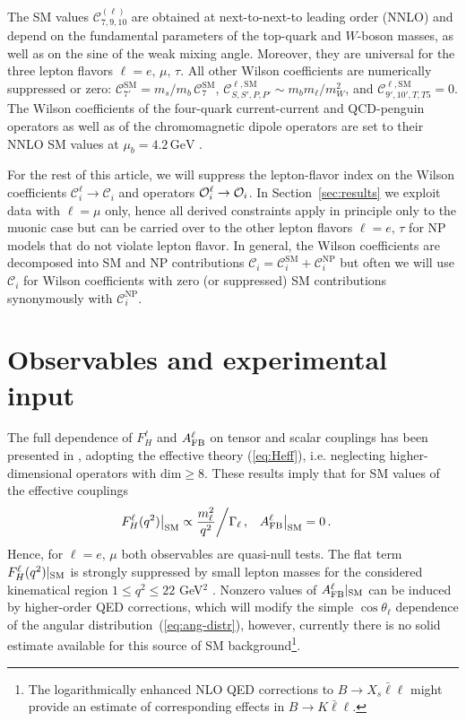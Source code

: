 \documentclass[twocolumn,epjc3]{svjour3}
\numberwithin{equation}{section}
\def \refeq#1{(\ref{#1})}
\def \refsec#1{Section~\ref{#1}}
\newcommand{\todo}[1]{{\color{magenta}{ {\bf ToDo: }{#1}}}}
\newcommand{\checked}[1]{{\color{brown}{ {\bf Checked: }{#1}}}}
\renewcommand{\checked}[1]{#1}
\newcommand{\wilson}[2][{}]{\mathcal{C}_{#2}^{\mathrm{#1}}}
\renewcommand{\[}{\big[}
\renewcommand{\]}{\big]}
\renewcommand{\(}{\big(}
\renewcommand{\)}{\big)}
\def \Op{{\cal O}}
\begin{document}
The SM values $\wilson[(\ell)]{7,9,10}$ are obtained at
next-to-next-to leading order (NNLO) \cite{Bobeth:2003at,
  Huber:2005ig} and depend on the fundamental parameters of the
top-quark and $W$-boson masses, as well as on the sine of the weak
mixing angle.  Moreover, they are universal for the three lepton
flavors $\ell = e,\, \mu,\, \tau$.  All other Wilson coefficients are
numerically suppressed or zero: $\wilson[SM]{7'} = m_s/m_b\,
\wilson[SM]{7}$, $\wilson[\ell, SM]{S,S',P,P'} \sim {m_b
  m_\ell/m_W^2}$, and $\wilson[\ell, SM]{9',10',T,T5} = 0$.  The
Wilson coefficients of the four-quark current-current and QCD-penguin
operators as well as of the chromomagnetic dipole operators are set to
their NNLO SM values at $\mu_b = 4.2 \, \mbox{GeV}$
\cite{Bobeth:2003at, Huber:2005ig}.

For the rest of this article, we will suppress the lepton-flavor index
on the Wilson coefficients $\wilson[\ell]{i} \to \wilson[]{i}$ and
operators $\Op_i^\ell \to \Op_i$. In \refsec{sec:results} we exploit
data with $\ell =\mu$ only, hence all derived constraints apply in
principle only to the muonic case but can be carried over to the other
lepton flavors $\ell = e,\, \tau$ for NP models that do not violate
lepton flavor. In general, the Wilson coefficients are decomposed into
SM and NP contributions $\wilson[]{i} = \wilson[SM]{i} +
\wilson[NP]{i}$ but often we will use $\wilson[]{i}$ for Wilson
coefficients with zero (or suppressed) SM contributions synonymously
with $\wilson[NP]{i}$.

%
%
%
\section{
  \checked{Observables and experimental input}
  \label{sec:observables}
}

The full dependence of $F_H^\ell$ and $A_{\rm FB}^\ell$ on tensor and
scalar couplings has been presented in \cite{Bobeth:2007dw,
  Bobeth:2012vn}, adopting the effective theory \refeq{eq:Heff},
i.e. neglecting higher-dimensional operators with {$\mbox{dim} \geq
  8$}. These results imply that for SM values of the effective
couplings
\begin{align}
  F_H^\ell(q^2) \big|_{\rm SM} & \propto \frac{m_\ell^2}{q^2}
    {\bigg/ \Gamma_\ell} \,, &
  A_{\rm FB}^\ell \big|_{\rm SM} & = 0 \,.
\end{align}
Hence, for $\ell = e,\, \mu$ both observables are quasi-null tests.
The flat term $F_H^\ell(q^2)|_{\rm SM}$ is strongly suppressed {by
  small lepton masses for the considered kinematical region $1 \leq
  q^2 \leq 22$ GeV$^2$} \cite{Bobeth:2007dw, Bobeth:2011nj,
  Bouchard:2013eph}.  Nonzero values of $A_{\rm FB}^\ell|_{\rm SM}$
can be induced by higher-order QED corrections, which will modify the
simple $\cos\theta_\ell$ dependence of the angular
distribution~\refeq{eq:ang-distr}, however, currently there is no
solid estimate available for this source of SM background\footnote{The
  {logarithmically enhanced NLO QED corrections} to $B\to
  X_s\bar\ell\ell$ \cite{Huber:2015sra} might provide an estimate of
  corresponding effects in $B\to K \bar\ell\ell$.}. \todo{David's
  comment?!}
\end{document}

